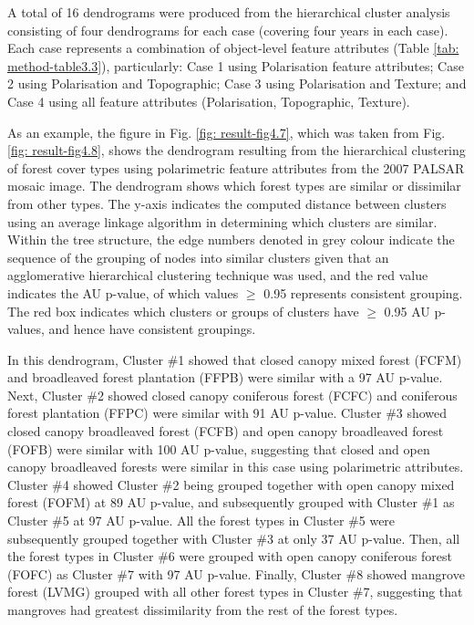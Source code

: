 A total of 16 dendrograms were produced from the hierarchical cluster analysis consisting of four dendrograms for each case (covering four years in each case). Each case represents a combination of object-level feature attributes (Table \ref{tab: method-table3.3}), particularly: Case 1 using Polarisation feature attributes; Case 2 using Polarisation and Topographic; Case 3 using Polarisation and Texture; and Case 4 using all feature attributes (Polarisation, Topographic, Texture).

As an example, the figure in Fig. \ref{fig: result-fig4.7}, which was taken from Fig. \ref{fig: result-fig4.8}, shows the dendrogram resulting from the hierarchical clustering of forest cover types using polarimetric feature attributes from the 2007 PALSAR mosaic image. The dendrogram shows which forest types are similar or dissimilar from other types. The y-axis indicates the computed distance between clusters using an average linkage algorithm in determining which clusters are similar. Within the tree structure, the edge numbers denoted in grey colour indicate the sequence of the grouping of nodes into similar clusters given that an agglomerative hierarchical clustering technique was used, and the red value indicates the AU p-value, of which values $\geq$ 0.95 represents consistent grouping. The red box indicates which clusters or groups of clusters have $\geq$ 0.95 AU p-values, and hence have consistent groupings.

In this dendrogram, Cluster \#1 showed that closed canopy mixed forest (FCFM) and broadleaved forest plantation (FFPB) were similar with a 97 AU p-value. Next, Cluster \#2 showed closed canopy coniferous forest (FCFC) and coniferous forest plantation (FFPC) were similar with 91 AU p-value. Cluster \#3 showed closed canopy broadleaved forest (FCFB) and open canopy broadleaved forest (FOFB) were similar with 100 AU p-value, suggesting that closed and open canopy broadleaved forests were similar in this case using polarimetric attributes. Cluster \#4 showed Cluster \#2 being grouped together with open canopy mixed forest (FOFM) at 89 AU p-value, and subsequently grouped with Cluster \#1 as Cluster \#5 at 97 AU p-value. All the forest types in Cluster \#5 were subsequently grouped together with Cluster \#3 at only 37 AU p-value. Then, all the forest types in Cluster \#6 were grouped with open canopy coniferous forest (FOFC) as Cluster \#7 with 97 AU p-value. Finally, Cluster \#8 showed mangrove forest (LVMG) grouped with all other forest types in Cluster \#7, suggesting that mangroves had greatest dissimilarity from the rest of the forest types.\\

